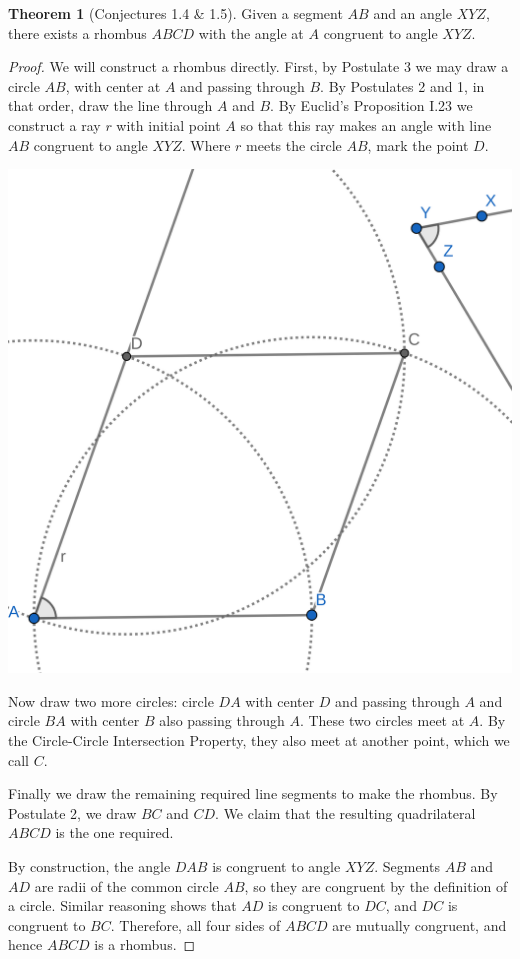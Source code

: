 \documentclass{tufte-handout}
\theoremstyle{definition}
\newtheorem{theorem}{Theorem}[section]
\begin{document}
\begin{theorem}[Conjectures 1.4 \& 1.5]\label{theorem:rhombus-construction}
Given a segment $AB$ and an angle $XYZ$, there exists a rhombus $ABCD$ with the angle at $A$ congruent to angle $XYZ$.
\end{theorem}

\begin{proof}
We will construct a rhombus directly. First, by Postulate 3 we may draw a circle $AB$, with center at $A$ and passing through $B$. By Postulates 2 and 1, in that order, draw the line through $A$ and $B$. By Euclid's Proposition I.23 we construct a ray $r$ with initial point $A$ so that this ray makes an angle with line $AB$ congruent to angle $XYZ$. Where $r$ meets the circle $AB$, mark the point $D$.

\begin{marginfigure}
  \includegraphics{images/rhombus_construction.png}
\end{marginfigure}


Now draw two more circles: circle $DA$ with center $D$ and passing through $A$ and circle $BA$ with center $B$ also passing through $A$. These two circles meet at $A$. By the Circle-Circle Intersection Property, they also meet at another point, which we call $C$.

Finally we draw the remaining required line segments to make the rhombus. By Postulate 2, we draw $BC$ and $CD$. We claim that the resulting quadrilateral $ABCD$ is the one required.

By construction, the angle $DAB$ is congruent to angle $XYZ$. Segments $AB$ and $AD$ are radii of the common circle $AB$, so they are congruent by the definition of a circle. Similar reasoning shows that $AD$ is congruent to $DC$, and $DC$ is congruent to $BC$. Therefore, all four sides of $ABCD$ are mutually congruent, and hence $ABCD$ is a rhombus.

\end{proof}
\end{document}

